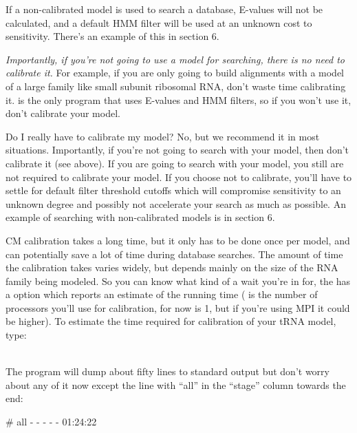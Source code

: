 If a non-calibrated model is used to search a database, E-values will not
be calculated, and a default HMM filter will be used at an unknown
cost to sensitivity. There's an example of this in section 6. 

\emph{Importantly, if you're not going to use a model for searching,
there is no need to calibrate it.} For example, if you are only going
to build alignments with a model of a large family like small subunit
ribosomal RNA, don't waste time calibrating it.  is the
only  program that uses E-values and HMM filters,
so if you won't use it, don't calibrate your model.

\begin{srefaq}{Do I really have to calibrate my model?} No, but we
  recommend it in most situations. Importantly, if you're not going to
  search with your model, then don't calibrate it (see above). If you
  are going to search with your model, you still are not required to
  calibrate your model. If you choose not to calibrate, you'll have to
  settle for default filter threshold cutoffs which will compromise
  sensitivity to an unknown degree and possibly not accelerate your
  search as much as possible. An example of
  searching with non-calibrated models is in section 6.
\end{srefaq}

CM calibration takes a long time, but it only has
to be done once per model, and can potentially save a lot of time
during database searches. The amount of time the calibration takes
varies widely, but depends mainly on the size of the RNA family being
modeled. 
So you can know what kind of a wait you're in for, the
 has a  option which reports an
estimate of the running time ( is the number of processors
you'll use for calibration, for now 
is 1, but if you're using MPI it could be higher). To estimate the
time required for calibration of your tRNA
model, type:

\\

The program will dump about fifty lines to standard output but 
don't worry about any of it now except the line with ``all'' in the
``stage'' column towards the end:

\begin{sreoutput}
# all         -    -    -          -      -       01:24:22
\end{sreoutput}

